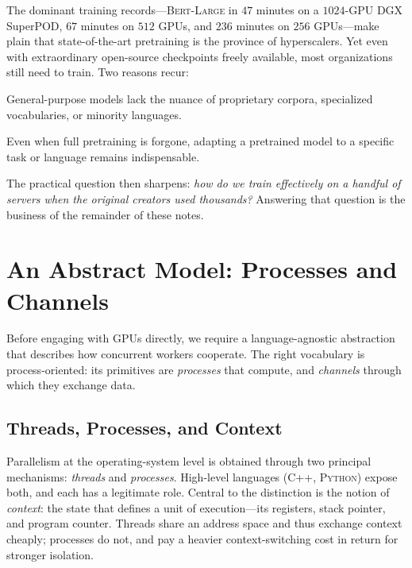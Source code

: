 \documentclass[11pt,a4paper]{article}
\theoremstyle{definition}
\theoremstyle{remark}
\theoremstyle{plain}
\begin{document}
The dominant training records---\textsc{Bert-Large} in $47$ minutes on a
$1024$-GPU DGX SuperPOD, $67$ minutes on $512$ GPUs, and $236$ minutes on
$256$ GPUs---make plain that state-of-the-art pretraining is the province
of hyperscalers. Yet even with extraordinary open-source checkpoints
freely available, most organizations still need to train. Two reasons
recur:

\begin{description}[leftmargin=1.5em, style=nextline]
  \item[Domain adaptation.] General-purpose models lack the nuance of
        proprietary corpora, specialized vocabularies, or minority
        languages.
  \item[Fine-tuning.] Even when full pretraining is forgone, adapting a
        pretrained model to a specific task or language remains
        indispensable.
\end{description}

The practical question then sharpens: \emph{how do we train effectively on
a handful of servers when the original creators used thousands?}
Answering that question is the business of the remainder of these notes.

\section{An Abstract Model: Processes and Channels}

Before engaging with GPUs directly, we require a language-agnostic
abstraction that describes how concurrent workers cooperate. The right
vocabulary is process-oriented: its primitives are \emph{processes} that
compute, and \emph{channels} through which they exchange data.

\subsection{Threads, Processes, and Context}

Parallelism at the operating-system level is obtained through two
principal mechanisms: \emph{threads} and \emph{processes}. High-level
languages (\textsc{C++}, \textsc{Python}) expose both, and each has a
legitimate role. Central to the distinction is the notion of
\emph{context}: the state that defines a unit of execution---its
registers, stack pointer, and program counter. Threads share an address
space and thus exchange context cheaply; processes do not, and pay a
heavier context-switching cost in return for stronger isolation.
\end{document}
